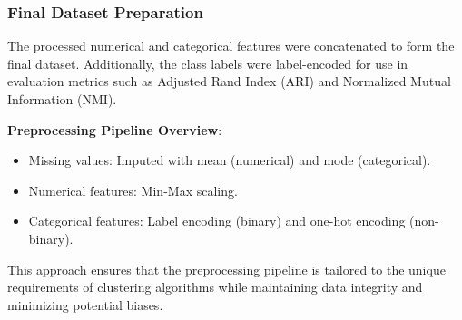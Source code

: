 \subsubsection{Final Dataset Preparation}
The processed numerical and categorical features were concatenated to form the final dataset. Additionally, the class labels were label-encoded for use in evaluation metrics such as Adjusted Rand Index (ARI) and Normalized Mutual Information (NMI).

\textbf{Preprocessing Pipeline Overview}:
\begin{itemize}
    \item Missing values: Imputed with mean (numerical) and mode (categorical).
    \item Numerical features: Min-Max scaling.
    \item Categorical features: Label encoding (binary) and one-hot encoding (non-binary).
\end{itemize}

This approach ensures that the preprocessing pipeline is tailored to the unique requirements of clustering algorithms while maintaining data integrity and minimizing potential biases.





